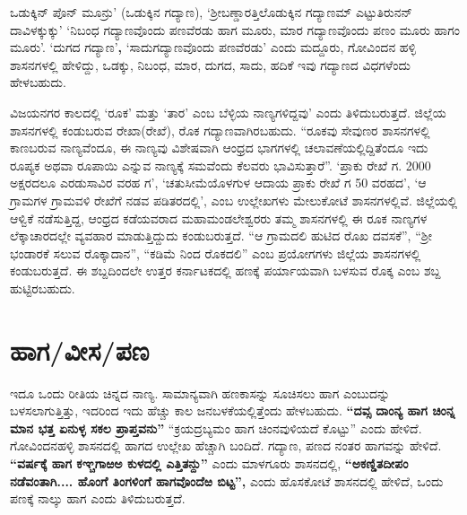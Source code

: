 ಒಡುಕ್ಕಿನ್​ ಪೊನ್​ ಮೂನ್ರು’ (ಒಡುಕ್ಕಿನ ಗದ್ಯಾಣ), ‘ಶ‍್ರೀಬಣ್ಡಾರತ್ತಿಲೊಡುಕ್ಕಿನ ಗದ್ಯಾಣಮ್ ಎಟ್ಟು\break ತಿರುನನ್​ದಾವಿಳಕ್ಕುಕ್ಕು’  ‘ನಿಬಂಧ ಗದ್ಯಾಣವೊಂದು ಪಣವೆರಡು ಹಾಗ ಮೂರು, ಮಾರ ಗದ್ಯಾಣವೊಂದು ಪಣಂ ಮೂರು ಹಾಗಂ ಮೂರು’. ‘ದುಗದ ಗದ್ಯಾಣ’\textbf{,} ‘ಸಾದುಗದ್ಯಾಣವೊಂದು ಪಣವೆರಡು’ ಎಂದು ಮದ್ದೂರು, ಗೋವಿಂದನ ಹಳ್ಳಿ ಶಾಸನಗಳಲ್ಲಿ ಹೇಳಿದ್ದು, ಒಡಕ್ಕು, ನಿಬಂಧ, ಮಾರ, ದುಗದ, ಸಾದು, ಹದಿಕೆ ಇವು ಗದ್ಯಾಣದ ವಿಧಗಳೆಂದು ಹೇಳಬಹುದು.

ವಿಜಯನಗರ ಕಾಲದಲ್ಲಿ ‘ರೂಕ’ ಮತ್ತು ‘ತಾರ’ ಎಂಬ ಬೆಳ್ಳಿಯ ನಾಣ್ಯಗಳಿದ್ದವು’ ಎಂದು ತಿಳಿದುಬರುತ್ತದೆ. ಜಿಲ್ಲೆಯ ಶಾಸನಗಳಲ್ಲಿ ಕಂಡುಬರುವ ರೇಖಾ(ರೇಖೆ), ರೊಕ ಗದ್ಯಾಣವಾಗಿರಬಹುದು. “ರೂಕವು ಸೇವುಣರ ಶಾಸನಗಳಲ್ಲಿ ಕಾಣಬರುವ ನಾಣ್ಯವೆಂದೂ, ಈ ನಾಣ್ಯವು ವಿಶೇಷವಾಗಿ ಆಂಧ್ರದ ಭಾಗಗಳಲ್ಲಿ ಚಲಾವಣೆಯಲ್ಲಿದ್ದಿತೆಂದೂ ಇದು ರೂಪ್ಯಕ ಅಥವಾ ರೂಪಾಯಿ ಎನ್ನುವ ನಾಣ್ಯಕ್ಕೆ ಸಮವೆಂದು ಕೆಲವರು ಭಾವಿಸುತ್ತಾರೆ”. ‘ಪ್ರಾಕು ರೇಖೆ ಗ. 2000 ಅಕ್ಷರದಲೂ ಎರಡುಸಾವಿರ ವರಹ ಗ’, ‘ಚತುಸೀಮೆಯೊಳಗುಳ ಆದಾಯ ಪ್ರಾಕು ರೇಖೆ ಗ 50 ವರಹದ’, ‘ಆ ಗ್ರಾಮಗಳ ಗ್ರಾಮವಳಿ ರೇಖೆಗೆ ನಡವ ಪಡಿತರದಲ್ಲಿ’, ಎಂಬ ಉಲ್ಲೇಖಗಳು ಮೇಲುಕೋಟೆ ಶಾಸನಗಳಲ್ಲಿವೆ. ಜಿಲ್ಲೆಯಲ್ಲಿ ಆಳ್ವಿಕೆ ನಡೆಸುತ್ತಿದ್ದ, ಆಂಧ್ರದ ಕಡೆಯವರಾದ ಮಹಾಮಂಡಲೇಶ್ವರರು ತಮ್ಮ ಶಾಸನಗಳಲ್ಲಿ ಈ ರೂಕ ನಾಣ್ಯಗಳ ಲೆಕ್ಕಾಚಾರದಲ್ಲೇ ವ್ಯವಹಾರ ಮಾಡುತ್ತಿದ್ದುದು ಕಂಡುಬರುತ್ತದೆ. “ಆ ಗ್ರಾಮದಲಿ ಹುಟಿದ ರೊಖ ದವಸಕೆ”, “ಶ‍್ರೀ ಭಂಡಾರಕೆ ಸಲುವ ರೊಕ್ಕಾದಾನ”, “ಕಡಿಮೆ ನಿಂದ ರೊಕದಲಿ” ಎಂಬ ಪ್ರಯೋಗಗಳು ಜಿಲ್ಲೆಯ ಶಾಸನಗಳಲ್ಲಿ ಕಂಡುಬರುತ್ತದೆ. ಈ ಶಬ್ದದಿಂದಲೇ ಉತ್ತರ ಕರ್ನಾಟಕದಲ್ಲಿ ಹಣಕ್ಕೆ ಪರ್ಯಾಯವಾಗಿ ಬಳಸುವ ರೊಕ್ಕ ಎಂಬ ಶಬ್ದ ಹುಟ್ಟಿರಬಹುದು.


\section{ಹಾಗ/ವೀಸ/ಪಣ}

ಇದೂ ಒಂದು ರೀತಿಯ ಚಿನ್ನದ ನಾಣ್ಯ. ಸಾಮಾನ್ಯವಾಗಿ ಹಣಕಾಸನ್ನು ಸೂಚಿಸಲು ಹಾಗ ಎಂಬುದನ್ನು ಬಳಸಲಾಗುತ್ತಿತ್ತು, ಇದರಿಂದ ಇದು ಹೆಚ್ಚು ಕಾಲ ಜನಬಳಕೆಯಲ್ಲಿತ್ತೆಂದು ಹೇಳಬಹುದು. \textbf{“ದವ್ಸ ದಾಂನ್ಯ ಹಾಗ ಚಿಂನ್ನ ಮಾನ ಭತ್ತ ಏನುಳ್ಳ ಸಕಲ ಪ್ರಾಪ್ತವನು”} “ಕ್ರಯದ್ರಬ್ಯಮಂ ಹಾಗ ಚಿಂನವುಳಿಯದೆ ಕೊಟ್ಟು” ಎಂದು ಹೇಳಿದೆ. ಗೋವಿಂದನಹಳ್ಳಿ ಶಾಸನದಲ್ಲಿ ಹಾಗದ ಉಲ್ಲೇಖ ಹೆಚ್ಚಾಗಿ ಬಂದಿದೆ. ಗದ್ಯಾಣ, ಪಣದ ನಂತರ ಹಾಗವನ್ನು ಹೇಳಿದೆ. \textbf{“ವರ್ಷಕ್ಕೆ ಹಾಗ ಕಞ್ಚಗಾಱಅ ಕುಳದಲ್ಲಿ ಎತ್ತಿತನ್ದು”} ಎಂದು ಮಾಳಗೂರು ಶಾಸನದಲ್ಲಿ, \textbf{“ಅಕಣ್ಡಿತದೀಪಂ ನಡೆವಂತಾಗಿ.... ಹೊಂಗೆ ತಿಂಗಳಿಂಗೆ ಹಾಗವೊಂದೆಱ ಬಿಟ್ಟ”, }ಎಂದು ಹೊಸಕೋಟೆ ಶಾಸನದಲ್ಲಿ ಹೇಳಿದೆ, ಒಂದು ಪಣಕ್ಕೆ ನಾಲ್ಕು ಹಾಗ ಎಂದು ತಿಳಿದುಬರುತ್ತದೆ.

